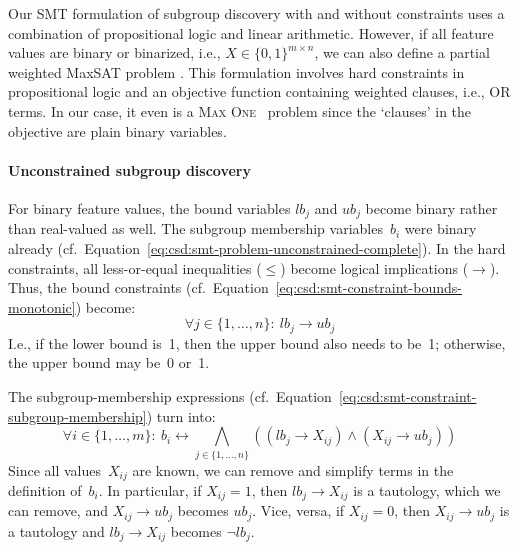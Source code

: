 \documentclass{article}
\theoremstyle{definition}
\begin{document}
Our SMT formulation of subgroup discovery with and without constraints uses a combination of propositional logic and linear arithmetic.
However, if all feature values are binary or binarized, i.e., $X \in \{0, 1\}^{m \times n}$, we can also define a partial weighted MaxSAT problem \cite{bacchus2021maximum, li2021maxsat}.
This formulation involves hard constraints in propositional logic and an objective function containing weighted clauses, i.e., OR terms.
In our case, it even is a \textsc{Max One}~\cite{khanna1997complete} problem since the `clauses' in the objective are plain binary variables.

\paragraph{Unconstrained subgroup discovery}

For binary feature values, the bound variables $\mathit{lb}_j$ and $\mathit{ub}_j$ become binary rather than real-valued as well.
The subgroup membership variables~$b_i$ were binary already (cf.~Equation~\ref{eq:csd:smt-problem-unconstrained-complete}).
In the hard constraints, all less-or-equal inequalities ($\leq$) become logical implications ($\rightarrow$).
Thus, the bound constraints (cf.~Equation~\ref{eq:csd:smt-constraint-bounds-monotonic}) become:
%
\begin{equation}
	\forall j \in \{1, \dots, n\}:~ \mathit{lb}_j \rightarrow \mathit{ub}_j
	\label{eq:csd:maxsat-constraint-bounds-monotonic}
\end{equation}
%
I.e., if the lower bound is~1, then the upper bound also needs to be~1; otherwise, the upper bound may be~0 or~1.

The subgroup-membership expressions (cf.~Equation~\ref{eq:csd:smt-constraint-subgroup-membership}) turn into:
%
\begin{equation}
	\forall i \in \{1, \dots, m\}:~ b_i\leftrightarrow \bigwedge_{j \in \{1, \dots, n\}} \left( \left( \mathit{lb}_j \rightarrow X_{ij} \right) \land \left( X_{ij} \rightarrow \mathit{ub}_j \right) \right)
	\label{eq:csd:maxsat-constraint-subgroup-membership}
\end{equation}
%
Since all values~$X_{ij}$ are known, we can remove and simplify terms in the definition of~$b_i$.
In particular, if $X_{ij} = 1$, then $\mathit{lb}_j \rightarrow X_{ij}$ is a tautology, which we can remove, and $X_{ij} \rightarrow \mathit{ub}_j$ becomes $\mathit{ub}_j$.
Vice, versa, if $X_{ij} = 0$, then $X_{ij} \rightarrow \mathit{ub}_j$ is a tautology and $\mathit{lb}_j \rightarrow X_{ij}$ becomes $\lnot \mathit{lb}_j$.
\end{document}
